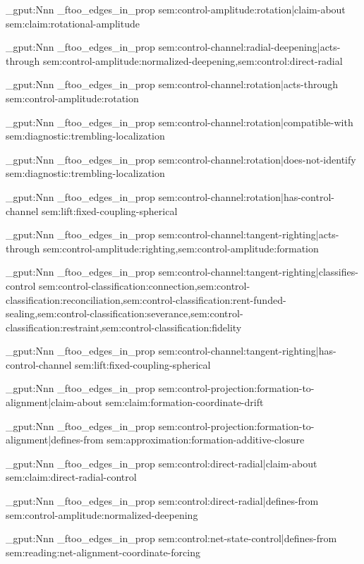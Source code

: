\prop_gput:Nnn \g_ftoo_edges_in_prop { sem:control-amplitude:rotation|claim-about } { sem:claim:rotational-amplitude }

\prop_gput:Nnn \g_ftoo_edges_in_prop { sem:control-channel:radial-deepening|acts-through } { sem:control-amplitude:normalized-deepening,sem:control:direct-radial }

\prop_gput:Nnn \g_ftoo_edges_in_prop { sem:control-channel:rotation|acts-through } { sem:control-amplitude:rotation }

\prop_gput:Nnn \g_ftoo_edges_in_prop { sem:control-channel:rotation|compatible-with } { sem:diagnostic:trembling-localization }

\prop_gput:Nnn \g_ftoo_edges_in_prop { sem:control-channel:rotation|does-not-identify } { sem:diagnostic:trembling-localization }

\prop_gput:Nnn \g_ftoo_edges_in_prop { sem:control-channel:rotation|has-control-channel } { sem:lift:fixed-coupling-spherical }

\prop_gput:Nnn \g_ftoo_edges_in_prop { sem:control-channel:tangent-righting|acts-through } { sem:control-amplitude:righting,sem:control-amplitude:formation }

\prop_gput:Nnn \g_ftoo_edges_in_prop { sem:control-channel:tangent-righting|classifies-control } { sem:control-classification:connection,sem:control-classification:reconciliation,sem:control-classification:rent-funded-sealing,sem:control-classification:severance,sem:control-classification:restraint,sem:control-classification:fidelity }

\prop_gput:Nnn \g_ftoo_edges_in_prop { sem:control-channel:tangent-righting|has-control-channel } { sem:lift:fixed-coupling-spherical }

\prop_gput:Nnn \g_ftoo_edges_in_prop { sem:control-projection:formation-to-alignment|claim-about } { sem:claim:formation-coordinate-drift }

\prop_gput:Nnn \g_ftoo_edges_in_prop { sem:control-projection:formation-to-alignment|defines-from } { sem:approximation:formation-additive-closure }

\prop_gput:Nnn \g_ftoo_edges_in_prop { sem:control:direct-radial|claim-about } { sem:claim:direct-radial-control }

\prop_gput:Nnn \g_ftoo_edges_in_prop { sem:control:direct-radial|defines-from } { sem:control-amplitude:normalized-deepening }

\prop_gput:Nnn \g_ftoo_edges_in_prop { sem:control:net-state-control|defines-from } { sem:reading:net-alignment-coordinate-forcing }

